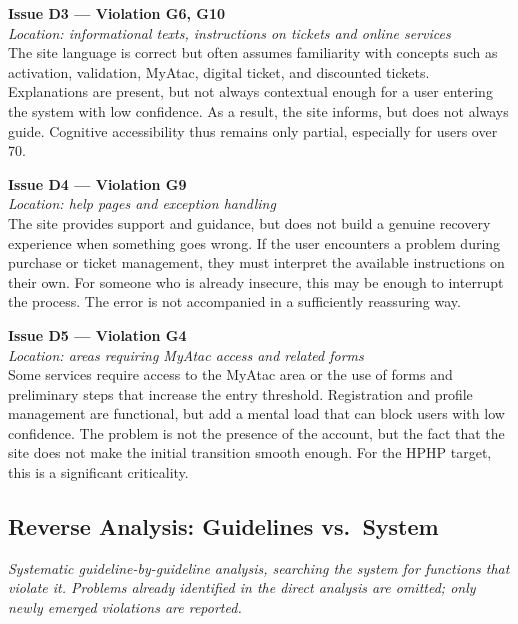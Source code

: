 ﻿\documentclass[11pt,a4paper]{article}
\begin{document}
\bigskip

\noindent\textbf{Issue D3 --- Violation G6, G10}\label{atac:D3}\\
\textit{Location: informational texts, instructions on tickets and online services}\\

\noindent The site language is correct but often assumes familiarity with concepts such as activation, validation, MyAtac, digital ticket, and discounted tickets. Explanations are present, but not always contextual enough for a user entering the system with low confidence. As a result, the site informs, but does not always guide. Cognitive accessibility thus remains only partial, especially for users over 70.

\bigskip

\noindent\textbf{Issue D4 --- Violation G9}\label{atac:D4}\\
\textit{Location: help pages and exception handling}\\

\noindent The site provides support and guidance, but does not build a genuine recovery experience when something goes wrong. If the user encounters a problem during purchase or ticket management, they must interpret the available instructions on their own. For someone who is already insecure, this may be enough to interrupt the process. The error is not accompanied in a sufficiently reassuring way.

\bigskip

\noindent\textbf{Issue D5 --- Violation G4}\label{atac:D5}\\
\textit{Location: areas requiring MyAtac access and related forms}\\

\noindent Some services require access to the MyAtac area or the use of forms and preliminary steps that increase the entry threshold. Registration and profile management are functional, but add a mental load that can block users with low confidence. The problem is not the presence of the account, but the fact that the site does not make the initial transition smooth enough. For the HPHP target, this is a significant criticality.

\subsection*{Reverse Analysis: Guidelines vs.\ System}

\noindent\textit{Systematic guideline-by-guideline analysis, searching the system for functions that violate it. Problems already identified in the direct analysis are omitted; only newly emerged violations are reported.}
\end{document}
